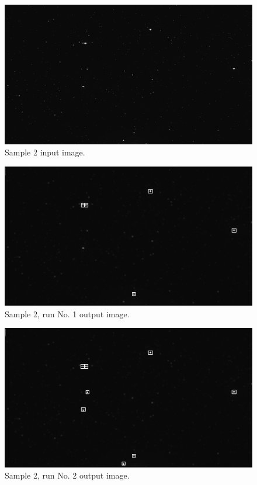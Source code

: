 \documentclass[12pt]{report}
\begin{document}
\begin{figure}[h]
    \centering
    \includegraphics[scale=1.2]{results/s1_in.png}
    \caption{Sample 2 input image.}
    \label{res:s1_in}
\end{figure}
\begin{figure}[h]
    \centering
    \includegraphics[scale=1.2]{results/s1_1.png}
    \caption{Sample 2, run No. 1 output image.}
    \label{res:s1_1}
\end{figure}
\begin{figure}[h]
    \centering
    \includegraphics[scale=1.2]{results/s1_2.png}
    \caption{Sample 2, run No. 2 output image.}
    \label{res:s1_2}
\end{figure}
\end{document}
